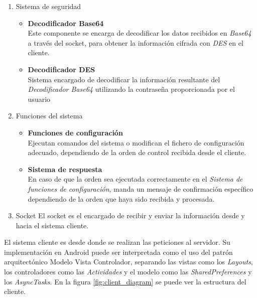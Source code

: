 \documentclass[12pt]{article}
\begin{document}
            \begin{enumerate}
                \item Sistema de seguridad
                    \begin{itemize}
                        \item \textbf{Decodificador Base64} \\
                            Este componente se encarga de decodificar los datos recibidos en \textit{Base64} a través del socket, para obtener la información cifrada con \textit{DES} en el cliente.
                        \item \textbf{Decodificador DES} \\ 
                            Sistema encargado de decodificar la información resultante del \textit{Decodificador Base64} utilizando la contraseña proporcionada por el usuario
                    \end{itemize}
                \item Funciones del sistema
                    \begin{itemize}
                        \item \textbf{Funciones de configuración} \\ 
                            Ejecutan comandos del sistema o modifican el fichero de configuración adecuado, dependiendo de la orden de control recibida desde el cliente.
                        \item \textbf{Sistema de respuesta} \\
                            En caso de que la orden sea ejecutada correctamente en el \textit{Sistema de funciones de configuración}, manda un mensaje de confirmación específico dependiendo de la orden que haya sido recibida y procesada.
                    \end{itemize}
                \item Socket
                    El socket es el encargado de recibir y enviar la información desde y hacia el sistema cliente.
            \end{enumerate}

            El sistema cliente es desde donde se realizan las peticiones al servidor. Su implementación en Android puede ser interpretada como el uso del patrón arquitectónico Modelo Vista Controlador, separando las vistas como los \textit{Layouts}, los controladores como las \textit{Actividades} y el modelo como las \textit{SharedPreferences} y los \textit{AsyncTasks}. En la figura \ref{fig:client_diagram} se puede ver la estructura del cliente.
\end{document}
